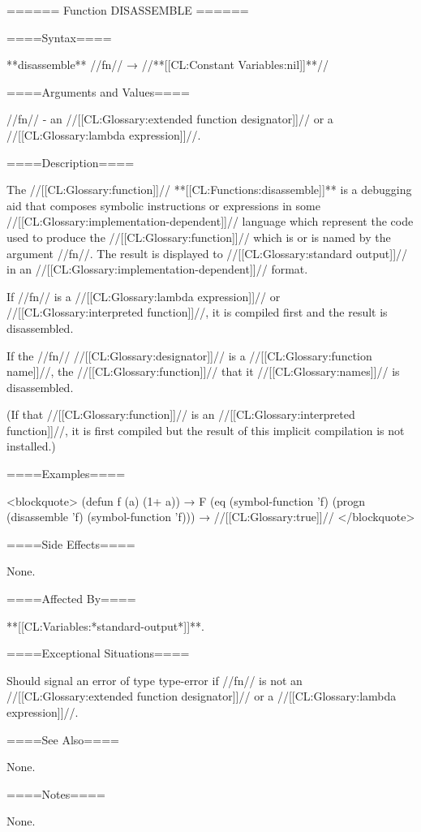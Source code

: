 ====== Function DISASSEMBLE ======

====Syntax====

**disassemble** //fn// → //**[[CL:Constant Variables:nil]]**//

====Arguments and Values====

//fn// - an //[[CL:Glossary:extended function designator]]// or a //[[CL:Glossary:lambda expression]]//.

====Description====

The //[[CL:Glossary:function]]// **[[CL:Functions:disassemble]]** is a debugging aid that composes symbolic instructions or expressions in some //[[CL:Glossary:implementation-dependent]]// language which represent the code used to produce the //[[CL:Glossary:function]]// which is or is named by the argument //fn//. The result is displayed to //[[CL:Glossary:standard output]]// in an //[[CL:Glossary:implementation-dependent]]// format.

If //fn// is a //[[CL:Glossary:lambda expression]]// or //[[CL:Glossary:interpreted function]]//, it is compiled first and the result is disassembled.

If the //fn// //[[CL:Glossary:designator]]// is a //[[CL:Glossary:function name]]//, the //[[CL:Glossary:function]]// that it //[[CL:Glossary:names]]// is disassembled.

(If that //[[CL:Glossary:function]]// is an //[[CL:Glossary:interpreted function]]//, it is first compiled but the result of this implicit compilation is not installed.)

====Examples====

<blockquote> (defun f (a) (1+ a)) → F (eq (symbol-function 'f) (progn (disassemble 'f) (symbol-function 'f))) → //[[CL:Glossary:true]]// </blockquote>

====Side Effects====

None.

====Affected By====

**[[CL:Variables:*standard-output*]]**.

====Exceptional Situations====

Should signal an error of type type-error if //fn// is not an //[[CL:Glossary:extended function designator]]// or a //[[CL:Glossary:lambda expression]]//.

====See Also====

None.

====Notes====

None.

   

